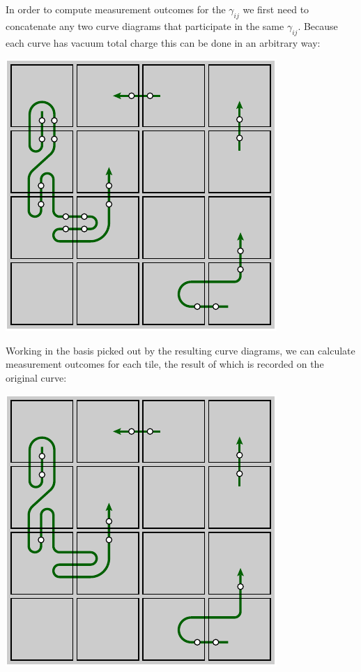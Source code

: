 \documentclass[aps, prl, letterpaper, twocolumn, superscriptaddress, notitlepage, 10pt]{revtex4-1}
\begin{document}
In order to compute measurement outcomes for the $\gamma_{ij}$
we first need to concatenate any two curve diagrams that 
participate in the same $\gamma_{ij}.$
Because each curve has vacuum total charge this can be
done in an arbitrary way:
\begin{center}
\includegraphics[]{pic-join-pairs.pdf}
\end{center}

Working in the basis picked out by the resulting curve
diagrams, we can calculate measurement outcomes for each tile,
the result of which is recorded on the original curve:
\begin{center}
\includegraphics[]{pic-curve-uniq.pdf}
\end{center}
\end{document}
